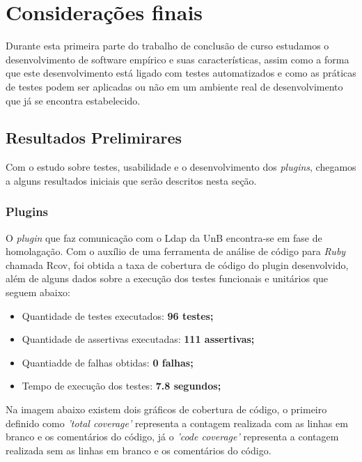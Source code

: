 \chapter{Considerações finais}
\label{consideracoes-finais}

Durante esta primeira parte do trabalho de conclusão de curso estudamos o desenvolvimento de software empírico e suas características, assim como a forma que este desenvolvimento está ligado com testes automatizados e como as práticas de testes podem ser aplicadas ou não em um ambiente real de desenvolvimento que já se encontra estabelecido.

\section{Resultados Prelimirares}
\label{results}

Com o estudo sobre testes, usabilidade e o desenvolvimento dos \textit{plugins}, chegamos a alguns resultados iniciais que serão descritos nesta seção.

\subsection{Plugins}

O \textit{plugin} que faz comunicação com o Ldap da UnB encontra-se em fase de homolagação. Com o auxílio de uma ferramenta de análise de código para \textit{Ruby} chamada Rcov, foi obtida a taxa de cobertura de código do plugin desenvolvido, além de alguns dados sobre a execução dos testes funcionais e unitários que seguem abaixo:

\begin{itemize}
\item Quantidade de testes executados: \textbf{96 testes;}
\item Quantidade de assertivas executadas: \textbf{111 assertivas;}
\item Quantiadde de falhas obtidas: \textbf{0 falhas;}
\item Tempo de execução dos testes: \textbf{7.8 segundos;}
\end{itemize}

Na imagem abaixo existem dois gráficos de cobertura de código, o primeiro definido como \textit{'total coverage'} representa a contagem realizada com as linhas em branco e os comentários do código, já o \textit{'code coverage'} representa a contagem realizada sem as linhas em branco e os comentários do código.

